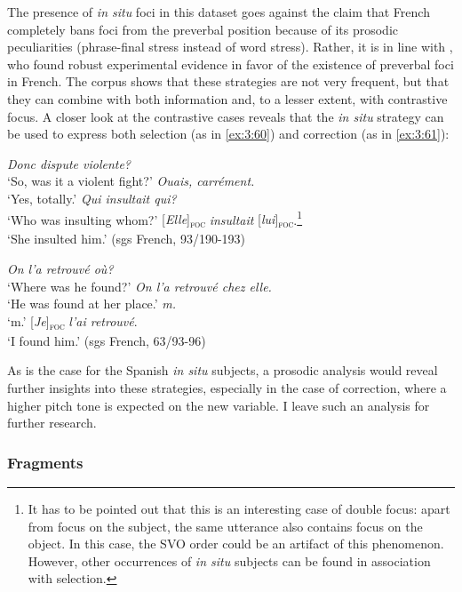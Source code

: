 The presence of \textit{in situ} foci in this dataset goes against the claim that French completely bans foci from the preverbal position \parencite[492]{lambrecht2001framework} because of its prosodic peculiarities (phrase-final stress instead of word stress). Rather, it is in line with \textcite{fery2001focus}, who found robust experimental evidence in favor of the existence of preverbal foci in French. The corpus shows that these strategies are not very frequent, but that they can combine with both information and, to a lesser extent, with contrastive focus. A closer look at the contrastive cases reveals that the \textit{in situ} strategy can be used to express both selection (as in \ref{ex:3:60}) and correction (as in \ref{ex:3:61}):

 \ea \label{ex:3:60}
\ea \textit{Donc dispute violente?}\\
 ‘So, was it a violent fight?'
 \ex \textit{Ouais, carrément.}\\
 ‘Yes, totally.'
  \textit{Qui insultait qui?}\\
 ‘Who was insulting whom?'
 {[\textit{Elle}]\textsubscript{\textsc{foc}}} \normalsize \textit{insultait} {[\textit{lui}]\textsubscript{\textsc{foc}}}.\footnote{It has to be pointed out that this is an interesting case of double focus: apart from focus on the subject, the same utterance also contains focus on the object. In this case, the SVO order could be an artifact of this phenomenon. However, other occurrences of \textit{in situ} subjects can be found in association with selection.}\\
‘She insulted him.' \hfill (sgs French, 93/190-193)   
\z \z 

 \ea \label{ex:3:61}
\ea \textit{On l'a retrouvé où?}\\
 ‘Where was he found?'
 \ex \textit{On l'a retrouvé chez elle.}\\
 ‘He was found at her place.'
  \textit{m.}\\
 ‘m.'
 {[\textit{Je}]\textsubscript{\textsc{foc}}} \normalsize \textit{l'ai retrouvé}. \\
‘I found him.' \hfill (sgs French, 63/93-96)    
\z \z 


As is the case for the Spanish \textit{in situ} subjects, a prosodic analysis would reveal further insights into these strategies, especially in the case of correction, where a higher pitch tone is expected on the new variable. I leave such an analysis for further research.


\subsubsection{Fragments}


